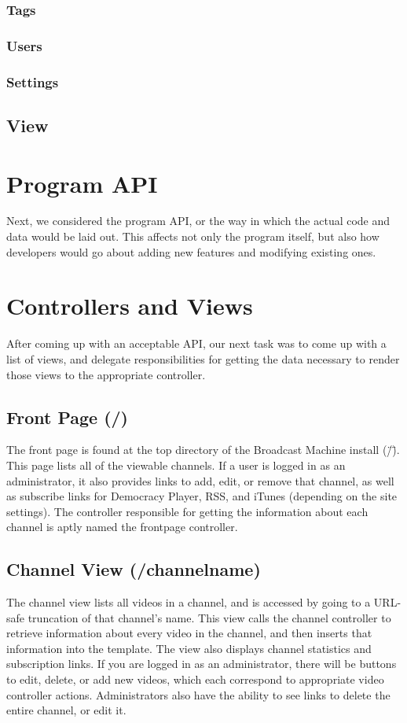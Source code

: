 \documentclass[a4paper,12pt]{report}
\begin{document}
\subsubsection*{Tags}
\subsubsection*{Users}
\subsubsection*{Settings}

\subsection{View}

\section{Program API}
Next, we considered the program API, or the way in which the actual code and data would be laid out.
This affects not only the program itself, but also how developers would go about adding new features and modifying existing ones.


\section{Controllers and Views}
After coming up with an acceptable API, our next task was to come up with a list of views, and delegate responsibilities for getting the data necessary to render those views to the appropriate controller.


\subsection{Front Page (/)}
The front page is found at the top directory of the Broadcast Machine install (\"/\").
This page lists all of the viewable channels.
If a user is logged in as an administrator, it also provides links to add, edit, or remove that channel, as well as subscribe links for Democracy Player, RSS, and iTunes (depending on the site settings).
The controller responsible for getting the information about each channel is aptly named the frontpage controller.


\subsection{Channel View (/channelname)}
The channel view lists all videos in a channel, and is accessed by going to a URL-safe truncation of that channel's name.
This view calls the channel controller to retrieve information about every video in the channel, and then inserts that information into the template.
The view also displays channel statistics and subscription links.
If you are logged in as an administrator, there will be buttons to edit, delete, or add new videos, which each correspond to appropriate video controller actions.
Administrators also have the ability to see links to delete the entire channel, or edit it.
\end{document}
